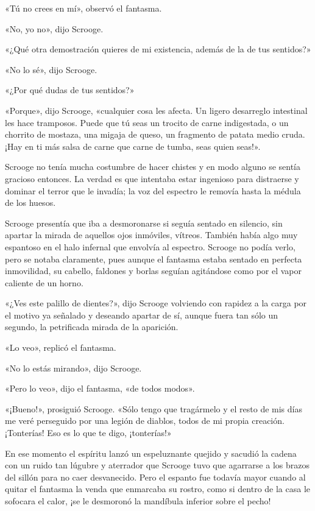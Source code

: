 \documentclass{novela}
\begin{document}
 «Tú no crees en mí», observó el fantasma.

 «No, yo no», dijo Scrooge.

 «¿Qué otra demostración quieres de mi existencia, además de la de tus sentidos?»

 «No lo sé», dijo Scrooge.

 «¿Por qué dudas de tus sentidos?»

 «Porque», dijo Scrooge, «cualquier cosa les afecta. Un ligero desarreglo intestinal les hace tramposos. Puede que tú seas un trocito de carne indigestada, o un chorrito de mostaza, una migaja de queso, un fragmento de patata medio cruda. ¡Hay en ti más salsa de carne que carne de tumba, seas quien seas!».

 Scrooge no tenía mucha costumbre de hacer chistes y en modo alguno se sentía gracioso entonces. La verdad es que intentaba estar ingenioso para distraerse y dominar el terror que le invadía; la voz del espectro le removía hasta la médula de los huesos.

 Scrooge presentía que iba a desmoronarse si seguía sentado en silencio, sin apartar la mirada de aquellos ojos inmóviles, vítreos. También había algo muy espantoso en el halo infernal que envolvía al espectro. Scrooge no podía verlo, pero se notaba claramente, pues aunque el fantasma estaba sentado en perfecta inmovilidad, su cabello, faldones y borlas seguían agitándose como por el vapor caliente de un horno.

 «¿Ves este palillo de dientes?», dijo Scrooge volviendo con rapidez a la carga por el motivo ya señalado y deseando apartar de sí, aunque fuera tan sólo un segundo, la petrificada mirada de la aparición.

 «Lo veo», replicó el fantasma.

 «No lo estás mirando», dijo Scrooge.

 «Pero lo veo», dijo el fantasma, «de todos modos».

 «¡Bueno!», prosiguió Scrooge. «Sólo tengo que tragármelo y el resto de mis días me veré perseguido por una legión de diablos, todos de mi propia creación. ¡Tonterías! Eso es lo que te digo, ¡tonterías!»

 En ese momento el espíritu lanzó un espeluznante quejido y sacudió la cadena con un ruido tan lúgubre y aterrador que Scrooge tuvo que agarrarse a los brazos del sillón para no caer desvanecido. Pero el espanto fue todavía mayor cuando al quitar el fantasma la venda que enmarcaba su rostro, como si dentro de la casa le sofocara el calor, ¡se le desmoronó la mandíbula inferior sobre el pecho!
\end{document}
